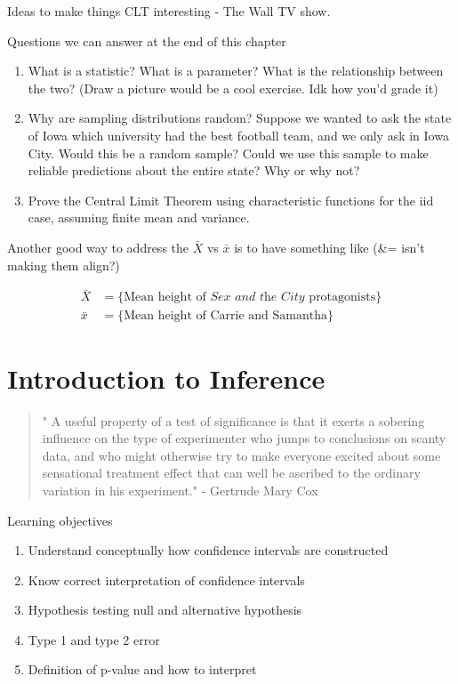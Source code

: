\documentclass[
]{book}
\providecommand{\tightlist}{%
  \setlength{\itemsep}{0pt}\setlength{\parskip}{0pt}}
\theoremstyle{definition}
\theoremstyle{definition}
\theoremstyle{definition}
\theoremstyle{remark}
\begin{document}
Ideas to make things CLT interesting - The Wall TV show.

Questions we can answer at the end of this chapter

\begin{enumerate}
\def\labelenumi{\arabic{enumi}.}
\tightlist
\item
  What is a statistic? What is a parameter? What is the relationship between the two? (Draw a picture would be a cool exercise. Idk how you'd grade it)
\item
  Why are sampling distributions random? Suppose we wanted to ask the state of Iowa which
  university had the best football team, and we only ask in Iowa City. Would this be a
  random sample? Could we use this sample to make reliable predictions about the entire state? Why or why not?
\item
  Prove the Central Limit Theorem using characteristic functions for the iid case, assuming finite mean and variance.
\end{enumerate}

Another good way to address the \(\bar{X}\) vs \(\bar{x}\) is to have something like (\&= isn't making them align?)

\[
\begin{align*}
\bar{X} &= \{\text{Mean height of} \textit{ Sex and the City } \text{protagonists}\} \\
\bar{x} &= \{\text{Mean height of Carrie and Samantha}\}
\end{align*}
\]

\hypertarget{ch7}{%
\chapter{Introduction to Inference}\label{ch7}}

\begin{quote}
" A useful property of a test of significance is that it exerts a sobering influence on the type of experimenter who jumps to conclusions on scanty data, and who might otherwise try to make everyone excited about some sensational treatment effect that can well be ascribed to the ordinary variation in his experiment." - Gertrude Mary Cox
\end{quote}

Learning objectives

\begin{enumerate}
\def\labelenumi{\arabic{enumi}.}
\tightlist
\item
  Understand conceptually how confidence intervals are constructed
\item
  Know correct interpretation of confidence intervals
\item
  Hypothesis testing null and alternative hypothesis
\item
  Type 1 and type 2 error
\item
  Definition of p-value and how to interpret
\end{enumerate}
\end{document}
